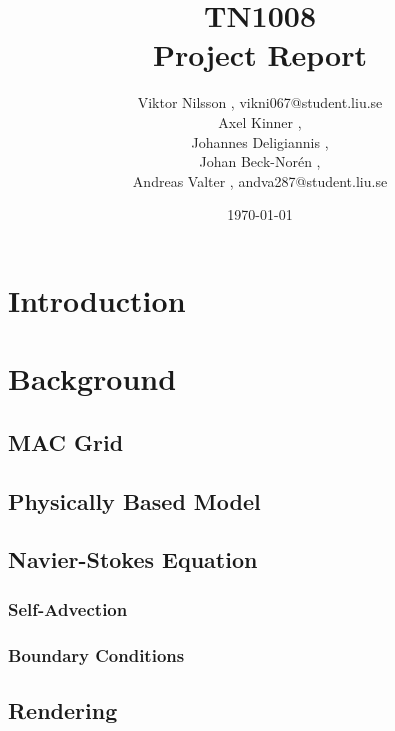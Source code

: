 \documentclass[]{report}   %
\begin{document}
\title{TN1008\\ Project Report}   %
\author{
  Viktor Nilsson , vikni067@student.liu.se 
  \\Axel Kinner ,
  \\Johannes Deligiannis ,
  \\Johan Beck-Norén ,
  \\Andreas Valter , andva287@student.liu.se
	}
        \date{\today}    %
        \maketitle
        
\setcounter{page}{2}



\begingroup
\let\clearpage\relax %
\chapter{Introduction}


\chapter{Background}
\section{MAC Grid}

\section{Physically Based Model}

\section{Navier-Stokes Equation}

\subsection{Self-Advection}

\subsection{Boundary Conditions}

\section{Rendering}

\end{document}
